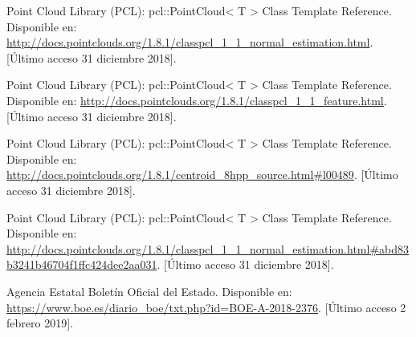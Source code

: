\begin{thebibliography}{99}
 Point Cloud Library (PCL): pcl::PointCloud< T > Class Template Reference. Disponible en: \url{http://docs.pointclouds.org/1.8.1/classpcl_1_1_normal_estimation.html}. [Último acceso 31 diciembre 2018].

 Point Cloud Library (PCL): pcl::PointCloud< T > Class Template Reference. Disponible en: \url{http://docs.pointclouds.org/1.8.1/classpcl_1_1_feature.html}. [Último acceso 31 diciembre 2018].


 Point Cloud Library (PCL): pcl::PointCloud< T > Class Template Reference. Disponible en: \url{http://docs.pointclouds.org/1.8.1/centroid_8hpp_source.html#l00489}. [Último acceso 31 diciembre 2018].


 Point Cloud Library (PCL): pcl::PointCloud< T > Class Template Reference. Disponible en: \url{http://docs.pointclouds.org/1.8.1/classpcl_1_1_normal_estimation.html#abd83b3241b46704f1ffc424dee2aa031}. [Último acceso 31 diciembre 2018].



 Agencia Estatal Boletín Oficial del Estado. Disponible en: \url{https://www.boe.es/diario_boe/txt.php?id=BOE-A-2018-2376}. [Último acceso 2 febrero 2019].



\end{thebibliography}
